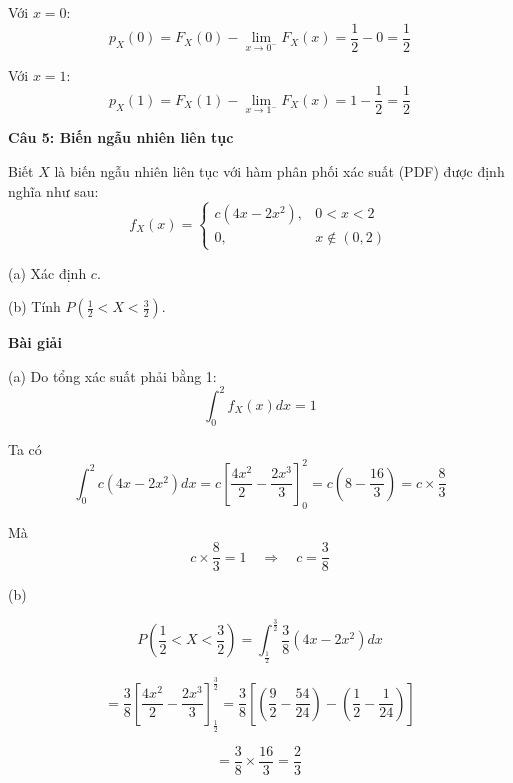 \documentclass[10pt,a4paper]{article}
\begin{document}
Với \(x = 0\):
\[
p_X(0) = F_X(0) - \lim_{x \to 0^-} F_X(x) = \frac{1}{2} - 0 = \frac{1}{2}
\]




Với \(x = 1\):
\[
p_X(1) = F_X(1) - \lim_{x \to 1^-} F_X(x) = 1 - \frac{1}{2} = \frac{1}{2}
\]




\textbf{Câu 5: Biến ngẫu nhiên liên tục}


Biết \(X\) là biến ngẫu nhiên liên tục với hàm phân phối xác suất (PDF) được định nghĩa như sau:
\[
f_X(x) = 
\begin{cases} 
	c(4x - 2x^2), & 0 < x < 2 \\
	0, & x \notin (0, 2) 
\end{cases}
\]

(a) Xác định \(c\).

(b) Tính \( P\left(\frac{1}{2} < X < \frac{3}{2}\right) \).

\textbf{Bài giải}

(a) Do tổng xác suất phải bằng 1:
\[
\int_0^2 f_X(x) dx = 1
\]



Ta có
\[
\int_0^2 c(4x - 2x^2) dx = c \left[\frac{4x^2}{2} - \frac{2x^3}{3}\right]_0^2 = c \left(8 - \frac{16}{3}\right) = c \times \frac{8}{3}
\]



Mà
\[
c \times \frac{8}{3} = 1 \quad \Rightarrow \quad c = \frac{3}{8}
\]


(b) 


\[
P\left(\frac{1}{2} < X < \frac{3}{2}\right) = \int_{\frac{1}{2}}^{\frac{3}{2}} \frac{3}{8}(4x - 2x^2) dx
\]




\[
=\frac{3}{8} \left[\frac{4x^2}{2} - \frac{2x^3}{3}\right]_{\frac{1}{2}}^{\frac{3}{2}}
= \frac{3}{8} \left[\left( \frac{9}{2} - \frac{54}{24} \right) - \left( \frac{1}{2} - \frac{1}{24} \right)\right]
\]





\[
=\frac{3}{8} \times \frac{16}{3} 
=\frac{2}{3}\
\]
\end{document}
